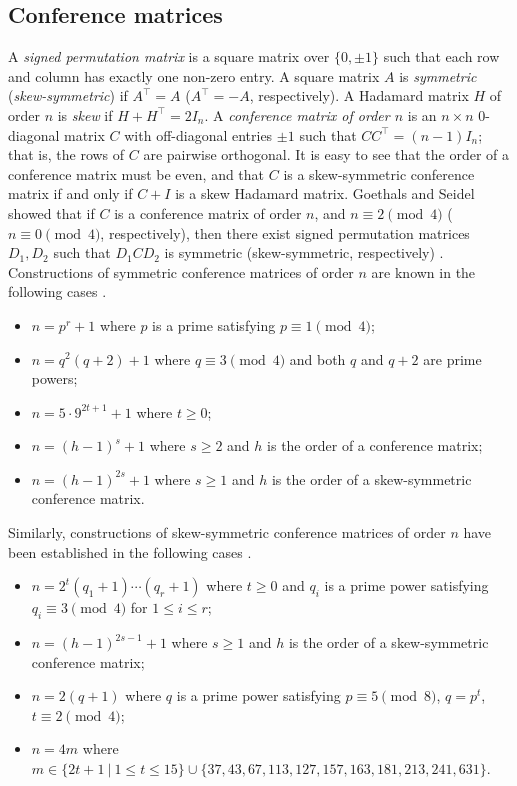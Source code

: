 \documentclass[11pt,oneside]{amsart}
\newcommand{\defn}[1]{\textit{#1}}
\begin{document}
{\subsection{Conference matrices} \label{confmatlitsubsec}
A \defn{signed permutation matrix} is a square matrix over $\{0,\pm 1\}$ such that each row and column has exactly one non-zero entry. A square matrix $A$ is \defn{symmetric} (\defn{skew-symmetric}) if $A^\top =A$ ($A^\top =-A$, respectively). A Hadamard matrix $H$ of order $n$ is \defn{skew} if $H+H^\top=2I_n$. A \defn{conference matrix of order $n$} is  an $n\times n$ 0-diagonal matrix $C$ with off-diagonal entries $\pm 1$  such that $CC^\top=(n-1)I_n$; that is, the rows of $C$ are pairwise orthogonal. 
It is easy to see that the order of a conference matrix must be  even, and  that $C$ is a skew-symmetric conference matrix if and only if $C+I$ is a skew  Hadamard matrix. Goethals and Seidel  showed that if $C$ is a conference matrix of order $n$, and $n\equiv 2\pmod{4}$ ($n\equiv 0\pmod{4}$, respectively), then there exist signed permutation matrices $D_1,D_2$ such that $D_1CD_2$ is symmetric (skew-symmetric, respectively) \cite{MR325418}.   
Constructions of symmetric conference matrices of order $n$ are known in the following cases \cite{BS14,MR1178508}. 
\begin{itemize}
    \item $n=p^r+1$ where $p$ is a prime satisfying $p\equiv1\pmod{4}$;  
    \item $n=q^2(q+2)+1$ where $q\equiv3\pmod{4}$ and both $q$ and $q+2$ are  prime powers;
    \item $n=5\cdot 9^{2t+1}+1$ where $t\geq 0$; 
    \item $n=(h-1)^s+1$ where $s\geq 2$ and $h$ is the order of a conference matrix;
    \item $n=(h-1)^{2s}+1$ where $s\geq 1$  and $h$ is the order of a skew-symmetric conference matrix.
\end{itemize}
Similarly, constructions of skew-symmetric conference matrices of order $n$
have been established in the following cases \cite{BS14,MR1178508}.
\begin{itemize}
    \item $n=2^t (q_1+1)\cdots (q_r+1)$ where $t\geq 0$  and  $q_i$ is a prime power satisfying $q_i\equiv 3\pmod{4}$ for $1\leq i\leq r$;
    \item $n=(h-1)^{2s-1}+1$ where $s\geq 1$ and $h$ is the order of a skew-symmetric conference matrix;
    \item $n=2(q+1)$ where $q$ is a prime power satisfying $p\equiv5\pmod{8}$, $q=p^t$,   $t\equiv 2\pmod{4}$;
    \item $n=4m$ where $m\in\{2t+1\ | \ 1\leq t\leq 15\}\cup\{37, 43, 67, 113, 127, 157, 163, 181, 213, 241, 631\}$.
\end{itemize}

}
\end{document}
